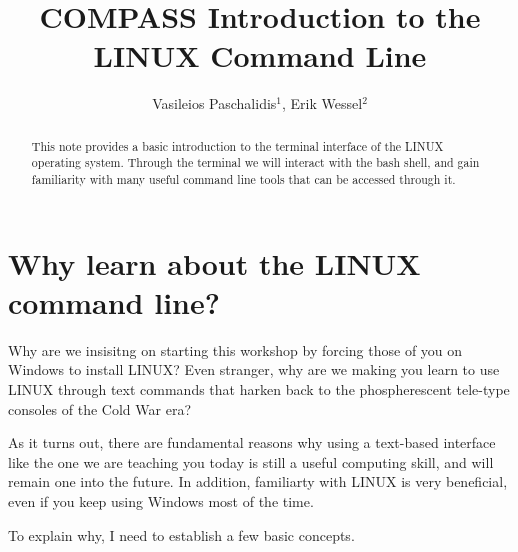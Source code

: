 \documentclass[aps,showpacs,prd,notitlepage,preprintnumbers,amsmath,amssymb,letterpaper]{revtex4}
\begin{document}
\title{COMPASS Introduction to the LINUX Command Line}
\author{Vasileios Paschalidis${}^1$, Erik Wessel${}^2$}                           
%
%
\begin{abstract}
  This note provides a basic introduction to the terminal interface of the LINUX operating system. Through the terminal we will interact with the bash shell, and gain familiarity with many useful command line tools that can be accessed through it.
\end{abstract}

\maketitle

\section{Why learn about the LINUX command line?}
Why are we insisitng on starting this workshop by forcing those of you on Windows to install LINUX?
Even stranger, why are we making you learn to use LINUX through text commands that harken back to the phospherescent tele-type consoles of the Cold War era?

As it turns out, there are fundamental reasons why using a text-based interface like the one we are teaching you today is still a useful computing skill, and will remain one into the future.
In addition, familiarty with LINUX is very beneficial, even if you keep using Windows most of the time.

To explain why, I need to establish a few basic concepts.
\end{document}
